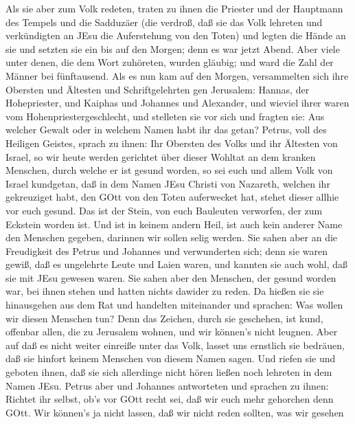 Als sie aber zum Volk redeten, traten zu ihnen die Priester
und der Hauptmann des Tempels und die Sadduzäer  (die
verdroß, daß sie das Volk lehreten und verkündigten an JEsu die
Auferstehung von den Toten)  und legten die Hände an sie und
setzten sie ein bis auf den Morgen; denn es war jetzt Abend.
 Aber viele unter denen, die dem Wort zuhöreten, wurden
gläubig; und ward die Zahl der Männer bei fünftausend.  Als
es nun kam auf den Morgen, versammelten sich ihre Obersten und Ältesten
und Schriftgelehrten gen Jerusalem:  Hannas, der
Hohepriester, und Kaiphas und Johannes und Alexander, und wieviel ihrer
waren vom Hohenpriestergeschlecht,  und stelleten sie vor
sich und fragten sie: Aus welcher Gewalt oder in welchem Namen habt ihr
das getan?  Petrus, voll des Heiligen Geistes, sprach zu
ihnen: Ihr Obersten des Volks und ihr Ältesten von Israel, 
so wir heute werden gerichtet über dieser Wohltat an dem kranken
Menschen, durch welche er ist gesund worden,  so sei euch
und allem Volk von Israel kundgetan, daß in dem Namen JEsu Christi von
Nazareth, welchen ihr gekreuziget habt, den GOtt von den Toten
auferwecket hat, stehet dieser allhie vor euch gesund.  Das
ist der Stein, von euch Bauleuten verworfen, der zum Eckstein worden
ist.  Und ist in keinem andern Heil, ist auch kein anderer
Name den Menschen gegeben, darinnen wir sollen selig werden.
 Sie sahen aber an die Freudigkeit des Petrus und Johannes
und verwunderten sich; denn sie waren gewiß, daß es ungelehrte Leute und
Laien waren, und kannten sie auch wohl, daß sie mit JEsu gewesen waren.
 Sie sahen aber den Menschen, der gesund worden war, bei
ihnen stehen und hatten nichts dawider zu reden.  Da hießen
sie sie hinausgehen aus dem Rat und handelten miteinander und sprachen:
 Was wollen wir diesen Menschen tun? Denn das Zeichen,
durch sie geschehen, ist kund, offenbar allen, die zu Jerusalem wohnen,
und wir können's nicht leugnen.  Aber auf daß es nicht
weiter einreiße unter das Volk, lasset uns ernstlich sie bedräuen, daß
sie hinfort keinem Menschen von diesem Namen sagen.  Und
riefen sie und geboten ihnen, daß sie sich allerdinge nicht hören ließen
noch lehreten in dem Namen JEsu.  Petrus aber und Johannes
antworteten und sprachen zu ihnen: Richtet ihr selbst, ob's vor GOtt
recht sei, daß wir euch mehr gehorchen denn GOtt.  Wir
können's ja nicht lassen, daß wir nicht reden sollten, was wir gesehen
